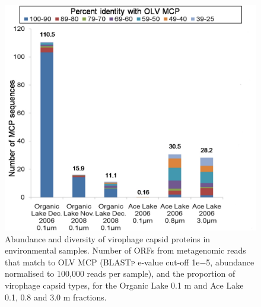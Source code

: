 \begin{figure}
\centering
\includegraphics[width=120mm]{olv_figures/OLV_time.jpg}
\caption[Virophage capsid proteins in environmental samples]{Abundance and diversity of virophage capsid proteins in environmental samples. 
Number of \acp{ORF} from metagenomic reads that match to \ac{OLV} \ac{MCP} (\textsc{BLASTp} e-value cut-off 1e$-$5, abundance normalised to 100,000 reads per sample), and the proportion of virophage capsid types, for the Organic Lake 0.1 \textmu{}m and Ace Lake 0.1, 0.8 and 3.0 \textmu{}m fractions.  
}
\label{fig:OLV_time}

\end{figure}
